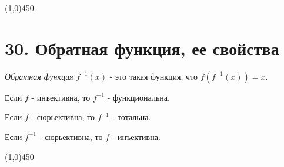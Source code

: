 \documentclass[a4paper,12pt]{article}
\begin{document}
	\begin{center}
		\line(1,0){450}
	\end{center}

	\section*{30. Обратная функция, ее свойства}
	\textit{Обратная функция $f^{-1}(x)$} - это такая функция, что $f(f^{-1}(x)) = x$.
	
	Если $f$ - инъективна, то $f^{-1}$ - функциональна.
	
	Если $f$ - сюрьективна, то $f^{-1}$ - тотальна.
	
	Если $f^{-1}$ - сюрьективна, то $f$ - инъективна. 
	
	\begin{center}
		\line(1,0){450}
	\end{center}
\end{document}
